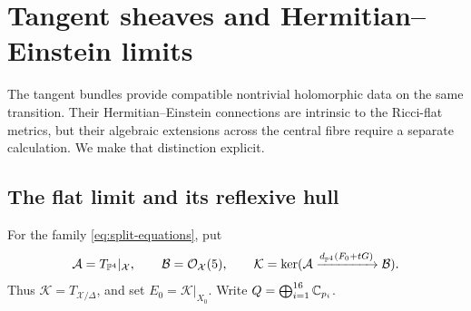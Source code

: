 \section{Tangent sheaves and Hermitian--Einstein limits}\label{sec:tangent}

The tangent bundles provide compatible nontrivial holomorphic data on the
same transition. Their Hermitian--Einstein connections are intrinsic to
the Ricci-flat metrics, but their algebraic extensions across the central
fibre require a separate calculation. We make that distinction explicit.

\subsection{The flat limit and its reflexive hull}
For the family \eqref{eq:split-equations}, put
\[
 \mathcal A=T_{\mathbb P^4}|_{\mathcal X},\qquad
 \mathcal B=\mathcal O_{\mathcal X}(5),\qquad
 \mathcal K=\ker(\mathcal A\xrightarrow{d_{\mathbb P^4}(F_0+tG)}\mathcal B).
\]
Thus $\mathcal K=T_{\mathcal X/\Delta}$, and set
$E_0=\mathcal K|_{X_0}$. Write $Q=\bigoplus_{i=1}^{16}\mathbb C_{p_i}$.

